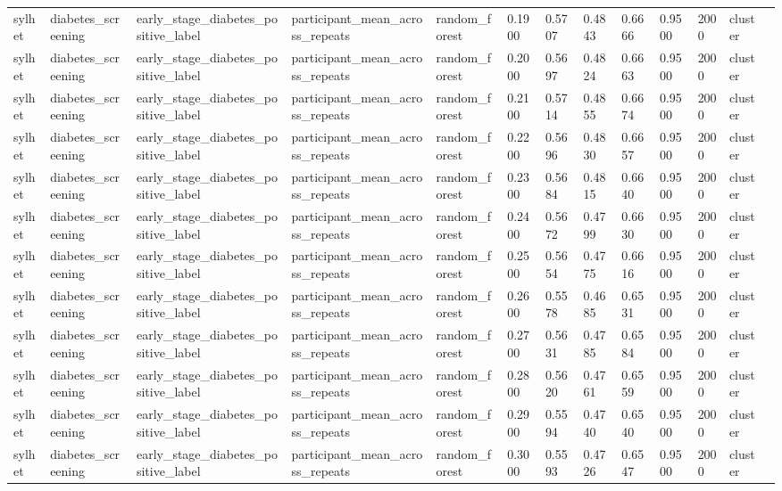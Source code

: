 \begin{tabular}{lllllllllllll}
sylhet & diabetes\_screening & early\_stage\_diabetes\_positive\_label & participant\_mean\_across\_repeats & random\_forest & 0.1900 & 0.5707 & 0.4843 & 0.6666 & 0.9500 & 2000 & cluster &  \\
sylhet & diabetes\_screening & early\_stage\_diabetes\_positive\_label & participant\_mean\_across\_repeats & random\_forest & 0.2000 & 0.5697 & 0.4824 & 0.6663 & 0.9500 & 2000 & cluster &  \\
sylhet & diabetes\_screening & early\_stage\_diabetes\_positive\_label & participant\_mean\_across\_repeats & random\_forest & 0.2100 & 0.5714 & 0.4855 & 0.6674 & 0.9500 & 2000 & cluster &  \\
sylhet & diabetes\_screening & early\_stage\_diabetes\_positive\_label & participant\_mean\_across\_repeats & random\_forest & 0.2200 & 0.5696 & 0.4830 & 0.6657 & 0.9500 & 2000 & cluster &  \\
sylhet & diabetes\_screening & early\_stage\_diabetes\_positive\_label & participant\_mean\_across\_repeats & random\_forest & 0.2300 & 0.5684 & 0.4815 & 0.6640 & 0.9500 & 2000 & cluster &  \\
sylhet & diabetes\_screening & early\_stage\_diabetes\_positive\_label & participant\_mean\_across\_repeats & random\_forest & 0.2400 & 0.5672 & 0.4799 & 0.6630 & 0.9500 & 2000 & cluster &  \\
sylhet & diabetes\_screening & early\_stage\_diabetes\_positive\_label & participant\_mean\_across\_repeats & random\_forest & 0.2500 & 0.5654 & 0.4775 & 0.6616 & 0.9500 & 2000 & cluster &  \\
sylhet & diabetes\_screening & early\_stage\_diabetes\_positive\_label & participant\_mean\_across\_repeats & random\_forest & 0.2600 & 0.5578 & 0.4685 & 0.6531 & 0.9500 & 2000 & cluster &  \\
sylhet & diabetes\_screening & early\_stage\_diabetes\_positive\_label & participant\_mean\_across\_repeats & random\_forest & 0.2700 & 0.5631 & 0.4785 & 0.6584 & 0.9500 & 2000 & cluster &  \\
sylhet & diabetes\_screening & early\_stage\_diabetes\_positive\_label & participant\_mean\_across\_repeats & random\_forest & 0.2800 & 0.5620 & 0.4761 & 0.6559 & 0.9500 & 2000 & cluster &  \\
sylhet & diabetes\_screening & early\_stage\_diabetes\_positive\_label & participant\_mean\_across\_repeats & random\_forest & 0.2900 & 0.5594 & 0.4740 & 0.6540 & 0.9500 & 2000 & cluster &  \\
sylhet & diabetes\_screening & early\_stage\_diabetes\_positive\_label & participant\_mean\_across\_repeats & random\_forest & 0.3000 & 0.5593 & 0.4726 & 0.6547 & 0.9500 & 2000 & cluster &  \\

\end{tabular}
